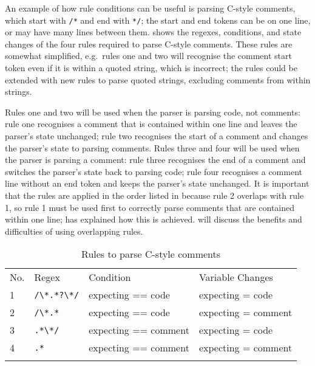 An example of how rule conditions can be useful is parsing C-style
comments, which start with \texttt{/*} and end with \texttt{*/}; the start
and end tokens can be on one line, or may have many lines between them.
 shows the regexes, conditions,
and state changes of the four rules required to parse C-style comments.
These rules are somewhat simplified, e.g.\ rules one and two will recognise
the comment start token even if it is within a quoted string, which is
incorrect; the rules could be extended with new rules to parse quoted
strings, excluding comments from within strings.

Rules one and two will be used when the parser is parsing code, not
comments: rule one recognises a comment that is contained within one line
and leaves the parser's state unchanged; rule two recognises the start of a
comment and changes the parser's state to parsing comments.  Rules three
and four will be used when the parser is parsing a comment: rule three
recognises the end of a comment and switches the parser's state back to
parsing code; rule four recognises a comment line without an end token and
keeps the parser's state unchanged.  It is important that the rules are
applied in the order listed in 
because rule 2 overlaps with rule 1, so rule 1 must be used first to
correctly parse comments that are contained within one line;
 has explained how this is achieved.
 will discuss the benefits
and difficulties of using overlapping rules.

\begin{table}[ht]
    \caption{Rules to parse C-style comments}
    \empty{}\label{Rules to parse C-style comments}
    \begin{tabular}{llll}
        \tabletopline{}%
        No.   & Regex             & Condition             & Variable Changes    \\
        \tablemiddleline{}%
        1     & \verb!/\*.*?\*/!  & expecting == code     & expecting = code      \\
        2     & \verb!/\*.*!      & expecting == code     & expecting = comment   \\
        3     & \verb!.*\*/!      & expecting == comment  & expecting = code      \\
        4     & \verb!.*!         & expecting == comment  & expecting = comment   \\
        \tablebottomline{}%
    \end{tabular}
\end{table}

